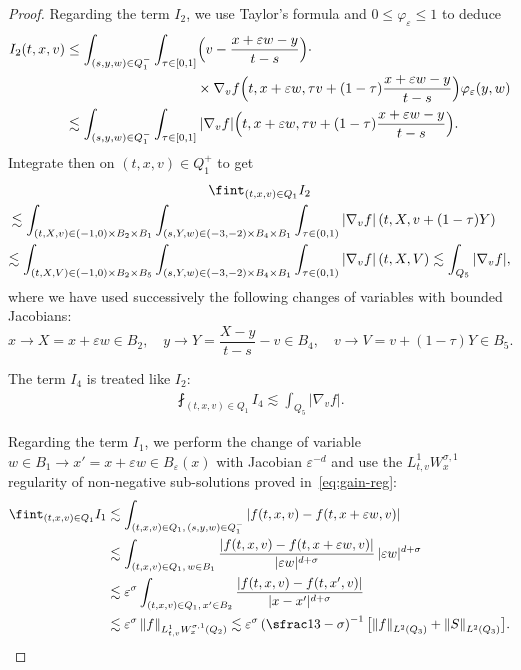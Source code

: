 \documentclass[10pt]{amsart}
\theoremstyle{definition}
\theoremstyle{remark}
\newcommand{\norm}[1]{\left\| #1 \right\|}
\let\var\varepsilon
\begin{document}
\begin{proof}
Regarding the term $I_2$, we use Taylor's formula and
$0\leq \varphi_\var\leq 1$ to deduce
\begin{align*}
I_2(t,x,v)
&\leq \int_{(s,y,w) \in Q_1^{-}} \int_{\tau\in [0,1]}
\Bigl(v-\frac{x+\varepsilon w-y}{t-s}\Bigr) \cdot \\
& \hspace{3.3cm} \times \nabla_v
f \Bigl(t,x+\varepsilon w, \tau v +
(1-\tau)\frac{x+\varepsilon w-y}{t-s} \Bigr)
\varphi_\var(y,w) \\
&\lesssim \int_{(s,y,w) \in Q_1^{-}} \int_{\tau\in [0,1]}
|\nabla_v f| \Bigl(t,x+\varepsilon w, \tau v +
(1-\tau)\frac{x+\varepsilon w-y}{t-s} \Bigr).
\end{align*}
Integrate then on $(t,x,v)\in Q_{1}^+$ to get
\begin{multline}
\label{estim I2}
\fint_{(t,x,v) \in Q_1} I_2 \\
\hspace*{-3mm}\lesssim \int_{(t,X,v)\in (-1,0)\times B_2 \times
B_1} \int_{(s,Y,w)\in (-3,-2)\times B_4 \times B_1}
\int_{\tau\in (0,1)} |\nabla_v f| \left(t,X, v+ (1-\tau) Y
\right) \\
\lesssim \int_{(t,X,V)\in (-1,0)\times B_2 \times
B_5} \int_{(s,Y,w)\in (-3,-2)\times B_4 \times B_1}
\int_{\tau\in (0,1)} |\nabla_v f| \left(t,X, V\right)
\lesssim \int_{Q_5} |\nabla_v f|,
\end{multline}
where we have used successively the following changes of
variables with bounded Jacobians:
\begin{equation*}
x\to X=x+\varepsilon w \in B_2, \quad
y\to Y= \frac{X -y}{t-s} -v\in B_4, \quad
v\to V=v+(1-\tau)Y\in B_5.
\end{equation*}

The term $I_4$ is treated like $I_2$:
\begin{align}
\label{estim I4}
\fint_{(t,x,v) \in Q_1} I_4 \lesssim \int_{Q_5} |\nabla_v f|.
\end{align}

Regarding the term $I_1 $, we perform the change of variable
$w \in B_1 \to x'=x+\varepsilon w \in B_\var(x)$ with
Jacobian $\var^{-d}$ and use the $L^1_{t,v} W^{\sigma,1}_{x}$
regularity of non-negative sub-solutions proved
in~\eqref{eq:gain-reg}:\vspace*{-3pt}
\begin{equation}
\label{estim I1}
\begin{aligned}
\fint_{(t,x,v)\in Q_1} I_1
& \lesssim \int_{(t,x,v)\in Q_1, \, (s,y,w)\in Q_1^{-}}
|f(t,x,v)-f(t,x+\varepsilon w,v) | \\
&\lesssim \int_{(t,x,v)\in Q_1, \, w \in B_1}
\frac{|f(t,x,v)-f(t,x+\varepsilon w,v)|}{|\varepsilon w
|^{d+\sigma}}\,|\varepsilon w|^{d+\sigma} \\
&\lesssim \var^\sigma \int_{(t,x,v)\in Q_1, \, x' \in B_2 }
\frac{|f(t,x,v)-f(t,x',v)|}{|x-x'|^{d+\sigma}} \\
& \lesssim \var^\sigma \norm{f}_{L^1_{t,v}W^{\sigma,1}_x(Q_2)}
\lesssim \var^\sigma \left( \sfrac13 -\sigma \right)^{-1}
\bigl[ \norm{f}_{L^2(Q_3)} + \norm{S}_{L^2(Q_3)} \bigr].
\end{aligned}
\end{equation}


\end{proof}
\end{document}
